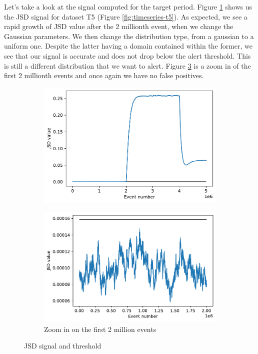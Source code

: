 Let's take a look at the signal computed for the target period. Figure \ref{fig:JSD-signal-test05} shows us the JSD signal for dataset T5 (Figure \ref{fig:timeseries-t5}). As expected, we see a rapid growth of JSD value after the 2 millionth event, when we change the Gaussian parameters. We then change the distribution type, from a gaussian to a uniform one. Despite the latter having a domain contained within the former, we see that our signal is accurate and does not drop below the alert threshold. This is still a different distribution that we want to alert. Figure \ref{fig:JSD-signal-zoom-test05} is a zoom in of the first 2 millionth events and once again we have no false positives.
\begin{figure}[!htb]
\centering
\begin{subfigure}{.5\textwidth}
  \centering
  \includegraphics[width=1\linewidth]{figures/stream-analysis-viz-test05.pdf}
  \label{fig:JSD-signal-test05}
\end{subfigure}%
\begin{subfigure}{.5\textwidth}
  \centering
  \includegraphics[width=1\linewidth]{figures/stream-analysis-viz-zoom-test05.pdf}
  \caption{Zoom in on the first 2 million events}
  \label{fig:JSD-signal-zoom-test05}
\end{subfigure}
\caption{JSD signal and threshold}
\end{figure}

